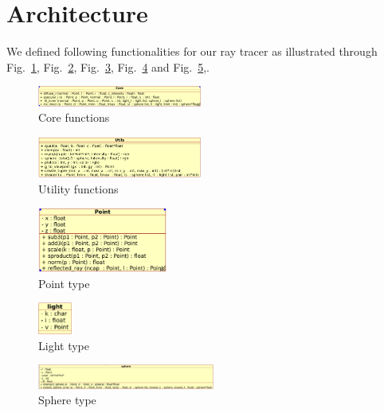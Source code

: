 \documentclass[conference]{IEEEtran}
\begin{document}
\section{Architecture}
We defined following functionalities for our ray tracer as illustrated through Fig.~\ref{Core functions}, Fig.~\ref{Utility functions}, Fig.~\ref{Point type}, Fig.~\ref{Light type} and Fig.~\ref{Sphere type},.

\begin{figure}[htbp]
  \centerline{\includegraphics[width=0.48\textwidth]{./figs/corediagram.png}}
  \caption{Core functions}
  \label{Core functions}
\end{figure}

\begin{figure}[htbp]
  \centerline{\includegraphics[width=0.48\textwidth]{./figs/utilsdiagram.png}}
  \caption{Utility functions}
  \label{Utility functions}
\end{figure}

\begin{figure}[htbp]
  \centerline{\includegraphics[width=0.38\textwidth]{./figs/pointdiagram.png}}
  \caption{Point type}
  \label{Point type}
\end{figure}

\begin{figure}[htbp]
  \centerline{\includegraphics[width=0.1\textwidth]{./figs/lightdigram.png}}
  \caption{Light type}
  \label{Light type}
\end{figure}

\begin{figure}[htbp]
  \centerline{\includegraphics[width=0.52\textwidth]{./figs/spherediagram.png}}
  \caption{Sphere type}
  \label{Sphere type}
\end{figure}
\end{document}
